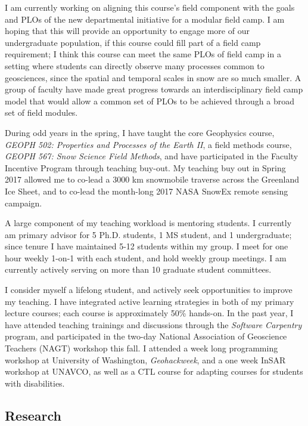 \documentclass[11pt]{article}
\begin{document}
I am currently working on aligning this course's field component with the goals and PLOs of the new departmental initiative for a modular field camp.  I am hoping that this will provide an opportunity to engage more of our undergraduate population, if this course could fill part of a field camp requirement; I think this course can meet the same PLOs of field camp in a setting where students can directly observe many processes common to geosciences, since the spatial and temporal scales in snow are so much smaller.  A group of faculty have made great progress towards an interdisciplinary field camp model that would allow a common set of PLOs to be achieved through a broad set of field modules.

During odd years in the spring, I have taught the core Geophysics course, \textit{GEOPH 502: Properties and Processes of the Earth II}, a field methods course, \textit{GEOPH 567: Snow Science Field Methods}, and have participated in the Faculty Incentive Program through teaching buy-out.  My teaching buy out in Spring 2017 allowed me to co-lead a 3000 km snowmobile traverse across the Greenland Ice Sheet, and to co-lead the month-long 2017 NASA SnowEx remote sensing campaign.  

A large component of my teaching workload is mentoring students.  I currently am primary advisor for 5 Ph.D. students, 1 MS student, and 1 undergraduate; since tenure I have maintained 5-12 students within my group.  I meet for one hour weekly 1-on-1 with each student, and hold weekly group meetings.  I am currently actively serving on more than 10 graduate student committees. 

I consider myself a lifelong student, and actively seek opportunities to improve my teaching.  I have integrated active learning strategies in both of my primary lecture courses; each course is approximately 50\% hands-on.  In the past year, I have attended teaching trainings and discussions through the \textit{Software Carpentry} program, and participated in the two-day National Association of Geoscience Teachers (NAGT) workshop this fall.  I attended a week long programming workshop at University of Washington, \textit{Geohackweek}, and a one week InSAR workshop at UNAVCO, as well as a CTL course for adapting courses for students with disabilities.

\subsection{Research}
\end{document}
